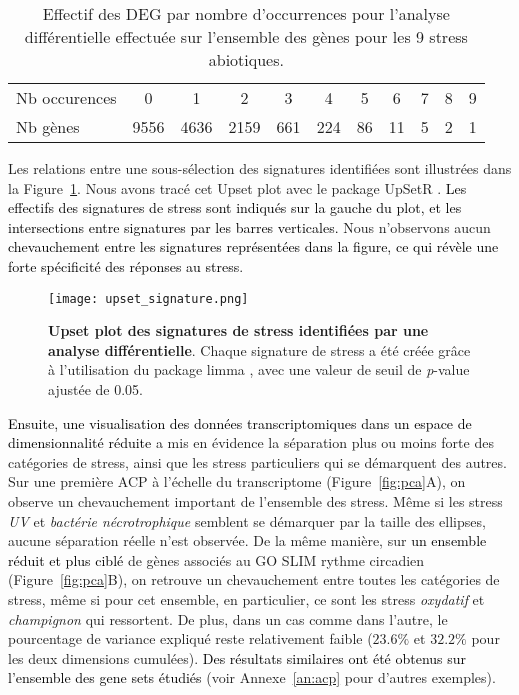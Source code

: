 \documentclass[twoside]{article}
\newcommand{\AR}[1]{\textcolor{black}{#1}}
\begin{document}
\vspace{0.3cm}
    \begin{table}[!h]
        \centering
        \begin{tabular}{|l|cccccccccc|}
        \hline
           Nb occurences & 0 & 1 & 2 & 3 & 4 & 5 & 6 & 7 & 8 & 9\\
         Nb gènes & 9556 & 4636 & 2159 & 661 & 224 & 86 & 11 & 5 & 2 & 1\\
         \hline
        \end{tabular}
        \caption[Effectif DEG pour les stress abiotiques]{\label{tab:DEG}Effectif des DEG par nombre d'occurrences pour l'analyse différentielle effectuée sur l'ensemble des gènes pour les 9 stress abiotiques.}
    \end{table}
    
\vspace{0.2cm}Les relations entre une sous-sélection des signatures identifiées sont illustrées dans la Figure~\ref{fig:upsetde}. Nous avons tracé cet Upset plot avec le package UpSetR \cite{conway_upsetr_2017}. \AR{Les effectifs des signatures de stress sont indiqués sur la gauche du plot, et les intersections entre signatures par les barres verticales.} Nous n'observons aucun  \AR{chevauchement entre les signatures représentées dans la figure, ce qui révèle une forte spécificité des réponses au stress}.

    \begin{figure}[h]
    \centering
        \texttt{[image: upset\_signature.png]}
        \caption[Upset plot des signatures de stress identifiées par une analyse différentielle]{\textbf{Upset plot des signatures de stress identifiées par une analyse différentielle}. Chaque signature de stress a été créée grâce à l'utilisation du package limma \cite{ritchie_limma_2015}, avec une valeur de seuil de \textit{p}-value ajustée de 0.05. \label{fig:upsetde}}
    \end{figure}
    

\vspace{0.5cm}\AR{Ensuite, une visualisation des données transcriptomiques dans un espace de dimensionnalité réduite} a mis en évidence la séparation plus ou moins forte des catégories de stress, ainsi que les stress particuliers qui se démarquent des autres. 
Sur une première ACP à l'échelle du transcriptome (Figure~\ref{fig:pca}A), on observe un chevauchement important de l'ensemble des stress. Même si les stress \textit{UV} et \textit{bactérie nécrotrophique} semblent se démarquer par la taille des ellipses, aucune séparation réelle n'est observée. De la même manière, sur \AR{un ensemble réduit et plus ciblé} de gènes associés au GO SLIM rythme circadien (Figure~\ref{fig:pca}B), on retrouve un chevauchement entre toutes les catégories de stress, même si pour cet ensemble, en particulier, ce sont les stress \textit{oxydatif} et \textit{champignon} qui ressortent. De plus, dans un cas comme dans l'autre, le pourcentage de variance expliqué reste relativement faible ($ 23.6 \%$ et $32.2 \%$ pour les deux dimensions cumulées). \AR{Des résultats similaires ont été obtenus sur l'ensemble des gene sets étudiés} (voir Annexe~\ref{an:acp} pour d'autres exemples).
\end{document}
